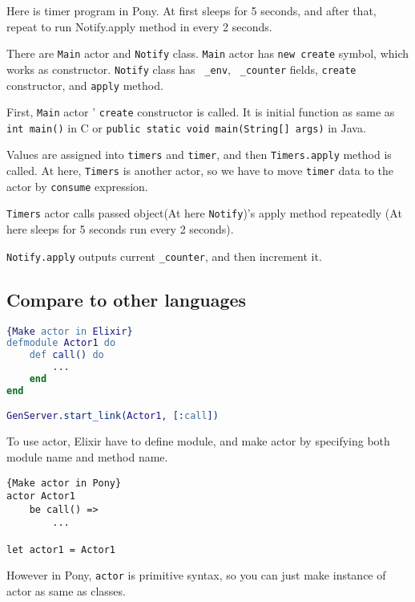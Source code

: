 \documentclass{article}
\begin{document}


Here is timer program in Pony.
At first sleeps for 5 seconds, and after that, repeat to run Notify.apply method in every 2 seconds.

There are \texttt{Main} actor and \texttt{Notify} class. 
\texttt{Main} actor has \texttt{new create} symbol, which works as constructor.
\texttt{Notify} class has \texttt{ \_env}, \texttt{ \_counter} fields, \texttt{create} constructor, and \texttt{apply} method.

First, \texttt{Main} actor ' \texttt{create} constructor is called. It is initial function as same as \texttt{int main()} in C or \texttt{public static void main(String[] args)} in Java. 

Values are assigned into \texttt{timers} and \texttt{timer}, and then \texttt{Timers.apply} method is called. 
At here, \texttt{Timers} is another actor, so we have to move \texttt{timer} data to the actor by \texttt{consume} expression.

 \texttt{Timers} actor calls passed object(At here \texttt{Notify})'s apply method repeatedly (At here sleeps for 5 seconds run every 2 seconds). 
 
\texttt{Notify.apply} outputs current \texttt{\_counter}, and then increment it.




\subsection{Compare to other languages}

\begin{lstlisting}[language=Erlang]{Make actor in Elixir}
defmodule Actor1 do
	def call() do
		...
	end	
end	

GenServer.start_link(Actor1, [:call])
\end{lstlisting}

To use actor, Elixir\cite{elixir} have to define module, and make actor by specifying both module name and method name.

\begin{lstlisting}{Make actor in Pony}
actor Actor1
	be call() =>
		...
		
let actor1 = Actor1		
\end{lstlisting}

However in Pony, \texttt{actor} is primitive syntax, so you can just make instance of actor as same as classes. \\
\end{document}
